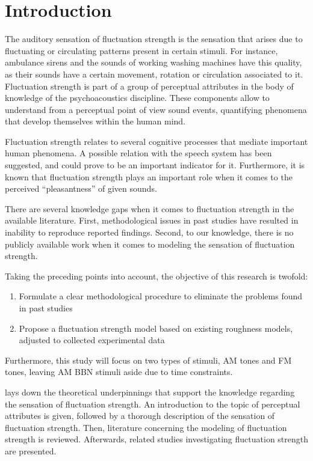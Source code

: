 \documentclass[../main.tex]{subfiles}
\begin{document}
\chapter{Introduction}
\label{cha:introduction}

The auditory sensation of fluctuation strength is the sensation that arises due
to fluctuating or circulating patterns present in certain stimuli. For instance,
ambulance sirens and the sounds of working washing machines have this quality,
as their sounds have a certain movement, rotation or circulation associated to
it. Fluctuation strength is part of a group of perceptual attributes in the body
of knowledge of the psychoacoustics discipline. These components allow to
understand from a perceptual point of view sound events, quantifying phenomena
that develop themselves within the human mind.

Fluctuation strength relates to several cognitive processes that mediate
important human phenomena. A possible relation with the speech system has been
suggested, and could prove to be an important indicator for it. Furthermore, it
is known that fluctuation strength plays an important role when it comes to the
perceived ``pleasantness'' of given sounds.

There are several knowledge gaps when it comes to fluctuation strength in the
available literature. First, methodological issues in past studies have resulted
in inability to reproduce reported findings. Second, to our knowledge, there is
no publicly available work when it comes to modeling the sensation of
fluctuation strength.

Taking the preceding points into account, the objective of this research is
twofold:
\begin{enumerate}
  \item Formulate a clear methodological procedure to eliminate the problems
    found in past studies
  \item Propose a fluctuation strength model based on existing roughness models,
    adjusted to collected experimental data
\end{enumerate}

Furthermore, this study will focus on two types of stimuli, \gls{AM} tones and
\gls{FM} tones, leaving \gls{AM} \gls{BBN} stimuli aside due to time
constraints.

 lays down the theoretical underpinnings that support the
knowledge regarding the sensation of fluctuation strength. An introduction to
the topic of perceptual attributes is given, followed by a thorough description
of the sensation of fluctuation strength. Then, literature concerning the
modeling of fluctuation strength is reviewed. Afterwards, related studies
investigating fluctuation strength are presented.
\end{document}
